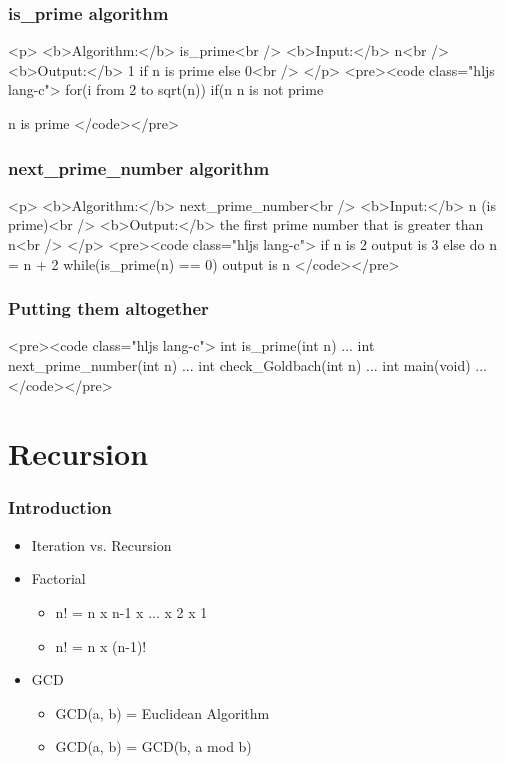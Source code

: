 \documentclass{../c-lecture}
\begin{document}
\begin{frame}
  \frametitle{is_prime algorithm}
  <p>
    <b>Algorithm:</b> is_prime<br />
    <b>Input:</b> n<br />
    <b>Output:</b> 1 if n is prime else 0<br />
  </p>
  <pre><code class="hljs lang-c">
for(i from 2 to sqrt(n))
  if(n %
    n is not prime

n is prime
  </code></pre>
\end{frame}
\begin{frame}
  \frametitle{next_prime_number algorithm}
  <p>
    <b>Algorithm:</b> next_prime_number<br />
    <b>Input:</b> n (is prime)<br />
    <b>Output:</b> the first prime number that is greater than n<br />
  </p>
  <pre><code class="hljs lang-c">
if n is 2
  output is 3
else
  do
    n = n + 2
  while(is_prime(n) == 0)
  output is n
  </code></pre>
\end{frame}
\begin{frame}
  \frametitle{Putting them altogether}
  <pre><code class="hljs lang-c">
int is_prime(int n) {
  ...
}
int next_prime_number(int n) {
  ...
}
int check_Goldbach(int n) {
  ...
}
int main(void) {
  ...
}
  </code></pre>
\end{frame}

\section{Recursion}

\begin{frame}
  \frametitle{Introduction}
  \begin{itemize}
    \item Iteration vs. Recursion
    \item Factorial
    \begin{itemize}
      \item n! = n x n-1 x ... x 2 x 1
      \item n! = n x (n-1)!
    \end{itemize}
    \item GCD
    \begin{itemize}
      \item GCD(a, b) = Euclidean Algorithm
      \item GCD(a, b) = GCD(b, a mod b)
    \end{itemize}
  \end{itemize}
\end{frame}
\end{document}
